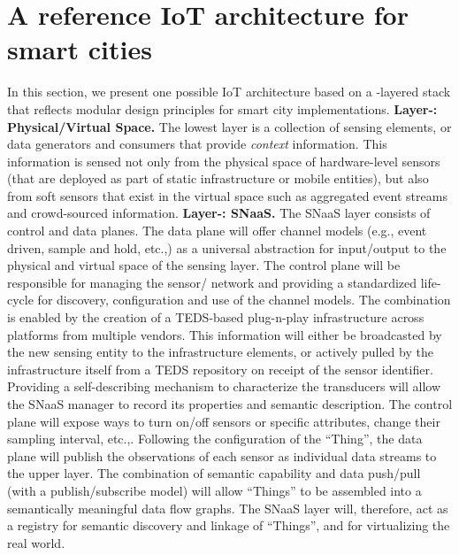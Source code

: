 \documentclass[conference]{IEEEtran}
\begin{document}
\section{A reference IoT architecture for smart cities}\label{sec:refIoT}

In this section, we present one possible IoT architecture based on a -layered stack that reflects modular design principles for smart city implementations.
\vspace{1mm}
\newline
\noindent
 \textbf{Layer-: Physical/Virtual Space.}
The lowest layer is a collection of sensing elements, or data generators and consumers that provide \emph{context} information.
This information is sensed not only from the physical space of hardware-level sensors (that are deployed as part of static infrastructure or mobile entities), but also from soft sensors that exist in the virtual space such as aggregated event streams and crowd-sourced information.
\vspace{1mm}
\newline
\noindent
 \textbf{Layer-: SNaaS.}
The SNaaS layer consists of control and data planes.
The data plane will offer channel models (e.g., event driven, sample and hold, etc.,) as a universal abstraction for input/output to the physical and virtual space of the sensing layer.
The control plane will be responsible for managing the sensor/ network and providing a standardized life-cycle for discovery, configuration and use of the channel models.
The combination is enabled by the creation of a TEDS-based plug-n-play infrastructure across platforms from multiple vendors.
This information will either be broadcasted by the new sensing entity to the infrastructure elements, or actively pulled by the infrastructure itself from a TEDS repository on receipt of the sensor identifier. 
Providing a self-describing mechanism to characterize the transducers will allow the SNaaS manager to record its properties and semantic description. 
The control plane will expose ways to turn on/off sensors or specific attributes, change their sampling interval, etc.,.\newline
\indent
Following the configuration of the ``Thing'', the data plane will publish the observations of each sensor as individual data streams to the upper layer.
The combination of semantic capability and data push/pull (with a publish/subscribe model) will allow ``Things'' to be assembled into a semantically meaningful data flow graphs\cite{Zhouiswc:2012}.
The SNaaS layer will, therefore, act as a registry for semantic discovery and linkage of ``Things'', and for virtualizing the real world.
\end{document}
